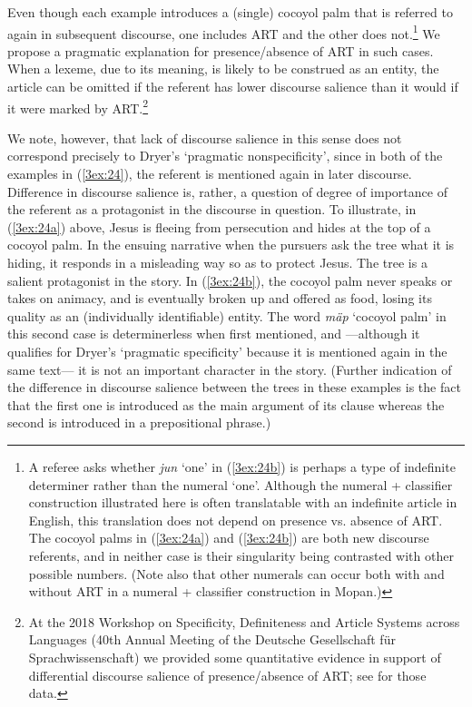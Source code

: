 \documentclass[output=paper]{langsci/langscibook}
\begin{document}
\newpage
Even though each example introduces a (single) cocoyol palm that is referred to again in subsequent discourse, one includes ART and the other does not.\footnote{{A referee asks whether {\emph{jun}} `one' in (\ref{3ex:24b}) is perhaps a type of indefinite determiner rather than the numeral `one'.  Although the numeral + classifier construction illustrated here is often translatable with an indefinite article in English, this translation does not depend on presence vs. absence of ART.  The cocoyol palms in (\ref{3ex:24a}) and (\ref{3ex:24b}) are both new discourse referents, and in neither case is their singularity being contrasted with other possible numbers.  (Note also that other numerals can occur both with and without ART in a numeral + classifier construction in Mopan.)}} We propose a pragmatic explanation for presence/absence of ART in such cases.  When a lexeme, due to its meaning, is likely to be construed as an entity, the article can be omitted if the referent has lower discourse salience than it would if it were marked by ART.\footnote{At the 2018 Workshop on Specificity, Definiteness and Article Systems across Languages (40th Annual Meeting of the Deutsche Gesellschaft f\"ur Sprachwissenschaft) we provided some quantitative evidence in support of differential discourse salience of presence/absence of ART; see \cite{contini:morava:danziger:fc} for those data.}

We note, however, that lack of discourse salience in this sense does not correspond precisely to Dryer's `pragmatic nonspecificity', since in both of the examples in (\ref{3ex:24}), the referent is mentioned again in later discourse. Difference in discourse salience is, rather, a question of degree of importance of the referent as a protagonist in the discourse in question.  To illustrate, in (\ref{3ex:24a}) above, Jesus is fleeing from persecution and hides at the top of a cocoyol palm.  In the ensuing narrative when the pursuers ask the tree what it is hiding, it responds in a misleading way so as to protect Jesus. The tree is a salient protagonist in the story.  In (\ref{3ex:24b}), the cocoyol palm never speaks or takes on animacy, and is eventually broken up and offered as food, losing its quality as an (individually identifiable) entity.  The word {\emph{m\"ap}} `cocoyol palm' in this second case is determinerless when first mentioned, and ---although it qualifies for Dryer's `pragmatic specificity' because it is mentioned again in the same text--- it is not an important character in the story.  (Further indication of the difference in discourse salience between the trees in these examples is the fact that the first one is introduced as the main argument of its clause whereas the second is introduced in a prepositional phrase.)
\end{document}
